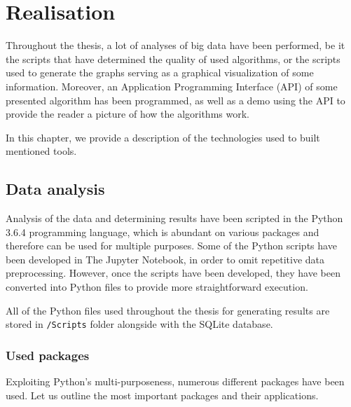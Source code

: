 \chapter{Realisation}
\label{ch:realisation}
Throughout the thesis, a lot of analyses of big data have been performed, be it the scripts that have determined the quality of used algorithms, or the scripts used to generate the graphs serving as a graphical visualization of some information. Moreover, an Application Programming Interface (API) of some presented algorithm has been programmed, as well as a demo using the API to provide the reader a picture of how the algorithms work. 

In this chapter, we provide a description of the technologies used to built mentioned tools.

\section{Data analysis}
Analysis of the data and determining results have been scripted in the Python 3.6.4 programming language, which is abundant on various packages and therefore can be used for multiple purposes. Some of the Python scripts have been developed in The Jupyter Notebook, in order to omit repetitive data preprocessing. However, once the scripts have been developed, they have been converted into Python files to provide more straightforward execution.

All of the Python files used throughout the thesis for generating results are stored in \texttt{/Scripts} folder alongside with the SQLite database.

\subsection{Used packages}
Exploiting Python's multi-purposeness, numerous different packages have been used. Let us outline the most important packages and their applications.

